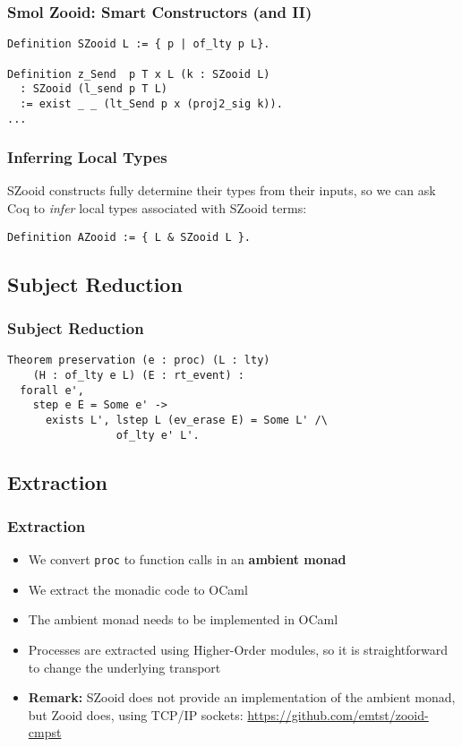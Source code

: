 \begin{frame}[fragile]
    \frametitle{Smol Zooid: Smart Constructors (and II)}
\begin{verbatim}
Definition SZooid L := { p | of_lty p L}.

Definition z_Send  p T x L (k : SZooid L)
  : SZooid (l_send p T L)
  := exist _ _ (lt_Send p x (proj2_sig k)).
...
\end{verbatim}
\end{frame}

\begin{frame}[fragile]
    \frametitle{Inferring Local Types}
    SZooid constructs fully determine their types from their inputs, so we can ask Coq to \emph{infer} local types
associated with SZooid terms:
\vspace{1cm}
\begin{verbatim}
Definition AZooid := { L & SZooid L }.
\end{verbatim}
\end{frame}

\subsection{Subject Reduction}

\begin{frame}[fragile]
\frametitle{Subject Reduction}
\begin{verbatim}
Theorem preservation (e : proc) (L : lty) 
    (H : of_lty e L) (E : rt_event) :
  forall e',
    step e E = Some e' ->
      exists L', lstep L (ev_erase E) = Some L' /\
                 of_lty e' L'.
\end{verbatim}
\end{frame}

\subsection{Extraction}

\begin{frame}[fragile]
\frametitle{Extraction}
\begin{itemize}
\item We convert \verb|proc| to function calls in an \textbf{ambient monad}
\item We extract the monadic code to OCaml
\item The ambient monad needs to be implemented in OCaml
\item Processes are extracted using Higher-Order modules, so it is straightforward to change the underlying
transport
\vspace{.2cm}
\item \textbf{Remark:} SZooid does not provide an implementation of the ambient monad, but Zooid does, using TCP/IP sockets: 
\url{https://github.com/emtst/zooid-cmpst}
\end{itemize}
\end{frame}

